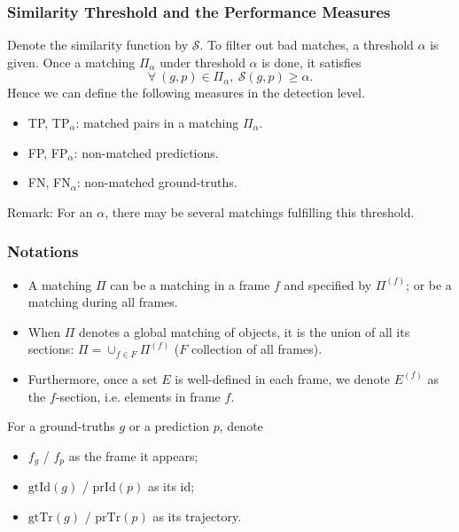 \documentclass[slidetop, mathserif]{beamer}
\begin{document}
\begin{frame}
	\frametitle{Similarity Threshold and the Performance Measures}
		
	Denote the similarity function by $\mathcal S$.
	To filter out bad matches, a threshold $\alpha$ is given.
	Once a matching $\Pi_\alpha$ under threshold $\alpha$ is done, it satisfies
	\[
		\forall\ (g,p)\in\Pi_\alpha, ~ \mathcal S(g,p) \geq \alpha.
	\]
	Hence we can define the following measures in the detection level.
	\begin{itemize}
		\item TP, TP$_\alpha$: matched pairs in a matching $\Pi_\alpha$.
		\item FP, FP$_\alpha$: non-matched predictions.
		\item FN, FN$_\alpha$: non-matched ground-truths.
	\end{itemize}
	{\color{red} Remark: For an $\alpha$, there may be several matchings fulfilling this threshold.}
\end{frame}

\begin{frame}
	\frametitle{Notations}
			
	\begin{itemize}
		\item A matching $\Pi$ can be a matching in a frame $f$ and specified by $\Pi^{(f)}$;
		      or be a matching during all frames.
		\item When $\Pi$ denotes a global matching of objects, it is the union of all its sections:
		      $\Pi = \cup_{f\in F}\Pi^{(f)}$ ($F$ collection of all frames).
		\item Furthermore, once a set $E$ is well-defined in each frame,
		      we denote $E^{(f)}$ as the $f$-section, i.e. elements in frame $f$.
		      		      		      
	\end{itemize}
			
	\vspace{-2pt}

	For a ground-truths $g$ or a prediction $p$, denote
	\begin{itemize}
		\item $f_g$ / $f_p$ as the frame it appears;
		\item $\text{gtId}(g)$ / $\text{prId}(p)$ as its id;
		\item $\text{gtTr}(g)$ / $\text{prTr}(p)$ as its trajectory.
	\end{itemize}

\end{frame}
\end{document}
